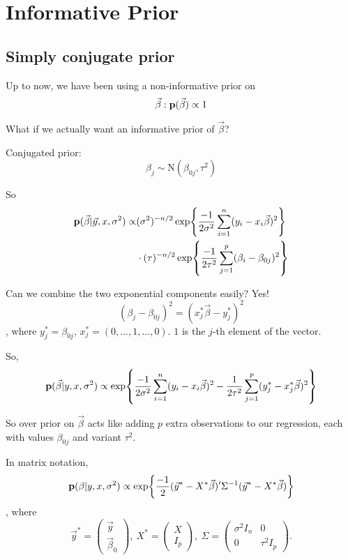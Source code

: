\section{Informative Prior}
\subsection{Simply conjugate prior}
Up to now, we have been using a non-informative prior on
\[
\Vec{\beta}: {\mathbf p}(\Vec{\beta}) \propto 1
\]

What if we actually want an informative prior of $\Vec{\beta}$?

Conjugated prior:
\[
\beta_j \sim \text{N}(\beta_{0j}, \tau^2)
\]

So 
\begin{align*}
    {\mathbf p}(\Vec{\beta}| \Vec{y}, x, \sigma^2)
    \propto& (\sigma^2)^{-n/2}\exp{\frac{-1}{2\sigma^2} \sum_{i=1}^n(y_i - x_i\Vec{\beta})^2}\\
    &\cdot(\tau)^{-n/2}\exp{\frac{-1}{2\tau^2} \sum_{j=1}^p(\beta_i - \beta_{0j})^2}
\end{align*}

Can we combine the two exponential components easily? Yes!
\[
(\beta_j - \beta_{0j})^2 = (x_j^* \Vec{\beta} - y_j^*)^2
\]
, where $y_j^* = \beta_{0j}$, $x_j^* = (0,\dots, 1, \dots, 0)$. $1$ is the $j$-th element of the vector.

So,
\[
{\mathbf p}(\Vec{\beta}| y, x, \sigma^2) \propto 
\exp{
\frac{-1}{2\sigma^2} \sum_{i=1}^n (y_i - x_i\Vec{\beta})^2 - \frac{1}{2\tau^2} \sum_{j=1}^p (y_j^* - x_j^* \Vec{\beta})^2
}
\]

So over prior on $\Vec{\beta}$ acts like adding $p$ extra observations to our regression, each with values $\beta_{0j}$ and variant $\tau^2$.

In matrix notation,
\begin{align*}
    {\mathbf p}(\beta| y, x, \sigma^2)
    \propto \exp{\frac{-1}{2} (\Vec{y}^* - X^*\Vec{\beta})' \Sigma^{-1} (\Vec{y}^* - X^*\Vec{\beta})}
\end{align*}
, where 
\[
    \Vec{y}^* 
    =
    \begin{pmatrix}
        \Vec{y}\\
        \Vec{\beta}_0
    \end{pmatrix},
    ~X^* 
    =
    \begin{pmatrix}
        X\\
        I_p
    \end{pmatrix},
    ~\Sigma
    =
    \begin{pmatrix}
        \sigma^2I_n & 0\\
        0 & \tau^2 I_p
    \end{pmatrix}.
\]

